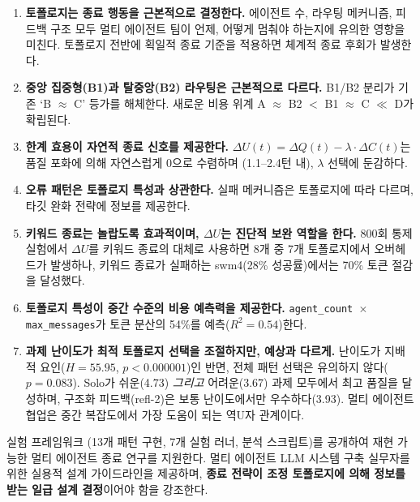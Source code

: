 \begin{enumerate}
\item \textbf{토폴로지는 종료 행동을 근본적으로 결정한다.} 에이전트 수, 라우팅 메커니즘, 피드백 구조 모두 멀티 에이전트 팀이 언제, 어떻게 멈춰야 하는지에 유의한 영향을 미친다. 토폴로지 전반에 획일적 종료 기준을 적용하면 체계적 종료 후회가 발생한다.

\item \textbf{중앙 집중형(B1)과 탈중앙(B2) 라우팅은 근본적으로 다르다.} B1/B2 분리가 기존 `B $\approx$ C' 등가를 해체한다. 새로운 비용 위계 A $\approx$ B2 $<$ B1 $\approx$ C $\ll$ D가 확립된다.

\item \textbf{한계 효용이 자연적 종료 신호를 제공한다.} $\Delta U(t) = \Delta Q(t) - \lambda \cdot \Delta C(t)$는 품질 포화에 의해 자연스럽게 0으로 수렴하며 (1.1--2.4턴 내), $\lambda$ 선택에 둔감하다.

\item \textbf{오류 패턴은 토폴로지 특성과 상관한다.} 실패 메커니즘은 토폴로지에 따라 다르며, 타깃 완화 전략에 정보를 제공한다.

\item \textbf{키워드 종료는 놀랍도록 효과적이며, $\Delta U$는 진단적 보완 역할을 한다.} 800회 통제 실험에서 $\Delta U$를 키워드 종료의 대체로 사용하면 8개 중 7개 토폴로지에서 오버헤드가 발생하나, 키워드 종료가 실패하는 swm4(28\% 성공률)에서는 70\% 토큰 절감을 달성했다.

\item \textbf{토폴로지 특성이 중간 수준의 비용 예측력을 제공한다.} \texttt{agent\_count $\times$ max\_messages}가 토큰 분산의 54\%를 예측($R^{2}=0.54$)한다.

\item \textbf{과제 난이도가 최적 토폴로지 선택을 조절하지만, 예상과 다르게.} 난이도가 지배적 요인($H=55.95$, $p<0.000001$)인 반면, 전체 패턴 선택은 유의하지 않다($p=0.083$). Solo가 쉬운(4.73) \emph{그리고} 어려운(3.67) 과제 모두에서 최고 품질을 달성하며, 구조화 피드백(refl-2)은 보통 난이도에서만 우수하다(3.93). 멀티 에이전트 협업은 중간 복잡도에서 가장 도움이 되는 역U자 관계이다.
\end{enumerate}

실험 프레임워크 (13개 패턴 구현, 7개 실험 러너, 분석 스크립트)를 공개하여 재현 가능한 멀티 에이전트 종료 연구를 지원한다. 멀티 에이전트 LLM 시스템 구축 실무자를 위한 실용적 설계 가이드라인을 제공하며, \textbf{종료 전략이 조정 토폴로지에 의해 정보를 받는 일급 설계 결정}이어야 함을 강조한다.

